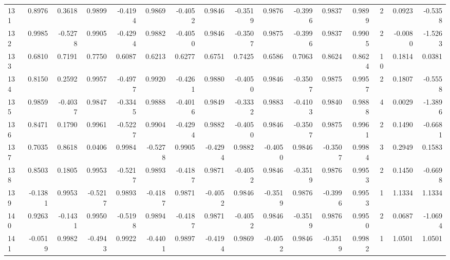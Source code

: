 \begin{tabular}{lrrrrrrrrrrrrrrr}
131 &      0.8976 &  0.3618 &  0.9899 & -0.4194 &  0.9869 & -0.4052 &  0.9846 & -0.3519 &  0.9876 & -0.3996 &   0.9837 &     0.9899 &      2 &                    0.0923 &                    -0.5358 \\
132 &      0.9985 & -0.5278 &  0.9905 & -0.4294 &  0.9882 & -0.4050 &  0.9846 & -0.3507 &  0.9875 & -0.3996 &   0.9837 &     0.9905 &      2 &                   -0.0080 &                    -1.5263 \\
133 &      0.6810 &  0.7191 &  0.7750 &  0.6087 &  0.6213 &  0.6277 &  0.6751 &  0.7425 &  0.6586 &  0.7063 &   0.8624 &     0.8624 &     10 &                    0.1814 &                     0.0381 \\
134 &      0.8150 &  0.2592 &  0.9957 & -0.4977 &  0.9920 & -0.4261 &  0.9880 & -0.4050 &  0.9846 & -0.3507 &   0.9875 &     0.9957 &      2 &                    0.1807 &                    -0.5558 \\
135 &      0.9859 & -0.4037 &  0.9847 & -0.3345 &  0.9888 & -0.4016 &  0.9849 & -0.3332 &  0.9883 & -0.4103 &   0.9840 &     0.9888 &      4 &                    0.0029 &                    -1.3896 \\
136 &      0.8471 &  0.1790 &  0.9961 & -0.5227 &  0.9904 & -0.4294 &  0.9882 & -0.4050 &  0.9846 & -0.3507 &   0.9875 &     0.9961 &      2 &                    0.1490 &                    -0.6681 \\
137 &      0.7035 &  0.8618 &  0.0406 &  0.9984 & -0.5278 &  0.9905 & -0.4294 &  0.9882 & -0.4050 &  0.9846 &  -0.3507 &     0.9984 &      3 &                    0.2949 &                     0.1583 \\
138 &      0.8503 &  0.1805 &  0.9953 & -0.5217 &  0.9893 & -0.4187 &  0.9871 & -0.4052 &  0.9846 & -0.3519 &   0.9876 &     0.9953 &      2 &                    0.1450 &                    -0.6698 \\
139 &     -0.1381 &  0.9953 & -0.5217 &  0.9893 & -0.4187 &  0.9871 & -0.4052 &  0.9846 & -0.3519 &  0.9876 &  -0.3996 &     0.9953 &      1 &                    1.1334 &                     1.1334 \\
140 &      0.9263 & -0.1431 &  0.9950 & -0.5198 &  0.9894 & -0.4187 &  0.9871 & -0.4052 &  0.9846 & -0.3519 &   0.9876 &     0.9950 &      2 &                    0.0687 &                    -1.0694 \\
141 &     -0.0519 &  0.9982 & -0.4943 &  0.9922 & -0.4401 &  0.9897 & -0.4194 &  0.9869 & -0.4052 &  0.9846 &  -0.3519 &     0.9982 &      1 &                    1.0501 &                     1.0501 \\

\end{tabular}
